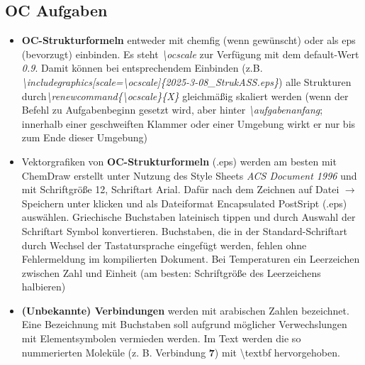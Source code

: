 \documentclass[./main.tex]{subfiles}
\begin{document}
\subsection{OC Aufgaben}
\begin{itemize}
    \item \textbf{OC-Strukturformeln} entweder mit chemfig (wenn gewünscht) oder als eps (bevorzugt) einbinden. Es steht \textit{\textbackslash ocscale} zur Verf\"ugung mit dem default-Wert \textit{0.9}. Damit k\"onnen bei entsprechendem Einbinden (z.B. \linebreak\textit{\textbackslash includegraphics[scale=\textbackslash ocscale]\{2025-3-08\_StrukASS.eps\}}) alle Strukturen durch\linebreak \textit{\textbackslash renewcommand\{\textbackslash ocscale\}\{X\}} gleichm\"a\ss{}ig skaliert werden (wenn der Befehl zu Aufgabenbeginn gesetzt wird, aber hinter \textit{\textbackslash aufgabenanfang}; innerhalb einer geschweiften Klammer oder einer Umgebung wirkt er nur bis zum Ende dieser Umgebung)
    \item Vektorgrafiken von \textbf{OC-Strukturformeln} (.eps) werden am besten mit ChemDraw erstellt unter Nutzung des Style Sheets \textit{ACS Document 1996} und mit Schriftgr\"o\ss{}e 12, Schriftart Arial. Dafür nach dem Zeichnen auf \glqq Datei\grqq{} $\rightarrow$ \glqq Speichern unter\grqq{} klicken und als Dateiformat  \glqq Encapsulated PostSript\grqq{} (.eps) auswählen. Griechische Buchstaben lateinisch tippen und durch Auswahl der Schriftart \glqq Symbol\grqq{} konvertieren. Buchstaben, die in der Standard-Schriftart durch Wechsel der Tastatursprache eingef\"ugt werden, fehlen ohne Fehlermeldung im kompilierten Dokument. Bei Temperaturen ein Leerzeichen zwischen Zahl und Einheit (am besten: Schriftgr\"o\ss{}e des Leerzeichens halbieren)
    \item \textbf{(Unbekannte) Verbindungen} werden mit arabischen Zahlen bezeichnet. Eine Bezeichnung mit Buchstaben soll aufgrund möglicher Verwechslungen mit Elementsymbolen vermieden werden. Im Text werden die so nummerierten Moleküle (z. B. Verbindung \textbf{7}) mit \textbackslash textbf hervorgehoben.

\end{itemize}
\end{document}
